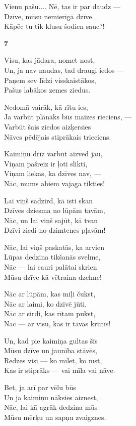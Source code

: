 \documentclass[14pt]{extarticle}
\begin{document}
{{Vienu pašu.... Nē, tas ir par daudz ---\\
Dzīve, mūsu nemierīgā dzīve.\\
Kāpēc tu tik klusu šodien sauc?!


\newpage 

{\bf 7} 

Visu, kas jādara, nomet nost,\\
Un, ja nav naudas, tad draugi iedos ---\\
Paņem sev līdzi visskaistākos,\\
Pašus labākos zemes ziedus. 

Nedomā vairāk, kā rītu ies,\\
Ja varbūt plānāks būs maizes rieciens, ---\\
Varbūt šais ziedos aizķersies\\
Nāves pēdējais stiprākais trieciens. 

Kaimiņu drīz varbūt aizved jau,\\
Viņam pašreiz ir ļoti slikti,\\
Viņam liekas, ka dzīves nav, ---\\
Nāc, mums abiem vajaga tikties!

Lai viņš sadzird, kā īsti skan\\
Dzīves dziesma no lūpām tavām,\\
Nāc, un lai viņš sajūt, kā tvan\\
Dzīvi ziedi no dzimtenes pļavām!

Nāc, lai viņš paskatās, ka arvien\\
Lūpas dedzina tikšanās svelme,\\
Nāc --- lai cauri palātai skrien\\
Mūsu dzīve kā vētraina dzelme!

Nāc ar lūpām, kas mīļi čukst,\\
Nāc ar laimi, ko dzīvē jūti,\\
Nāc ar sirdi, kas rītam pukst,\\
Nāc --- ar visu, kas ir tavās krūtīs!

Un, kad pie kaimiņa gultas šīs\\
Mūsu dzīve un jaunība stāvēs,\\
Redzēs visi --- ko mīlēt, ko nīst,\\
Kas ir stiprāks --- vai mīla vai nāve. 

Bet, ja arī par vēlu būs\\
Un ja kaimiņu nāksies aiznest,\\
Nāc, lai kā agrāk dedzina mūs\\
Mūsu mērķu un sapņu zvaigznes.

}}
\end{document}
